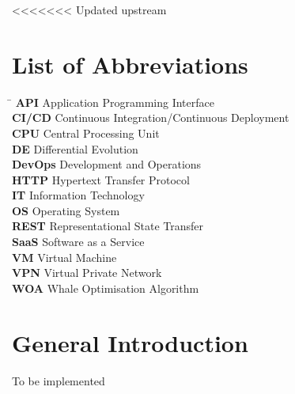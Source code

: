\documentclass[12pt,a4paper]{report}
\begin{document}
<<<<<<< Updated upstream
\newpage
\tableofcontents

\newpage
\listoffigures
{}

\newpage
\listoftables
{}

\newpage
\chapter*{List of Abbreviations}
\begin{tabbing}
\hspace{3cm} \= \kill
\textbf{API}   \> Application Programming Interface \\
\textbf{CI/CD} \> Continuous Integration/Continuous Deployment \\
\textbf{CPU}   \> Central Processing Unit \\
\textbf{DE}    \> Differential Evolution \\
\textbf{DevOps}\> Development and Operations \\
\textbf{HTTP}  \> Hypertext Transfer Protocol \\
\textbf{IT}    \> Information Technology \\
\textbf{OS}    \> Operating System \\
\textbf{REST}  \> Representational State Transfer \\
\textbf{SaaS}  \> Software as a Service \\
\textbf{VM}    \> Virtual Machine \\
\textbf{VPN}   \> Virtual Private Network \\
\textbf{WOA}   \> Whale Optimisation Algorithm \\
\end{tabbing}

\newpage
\chapter*{General Introduction}
To be implemented
\newpage

\setcounter{page}{1}

\end{document}
